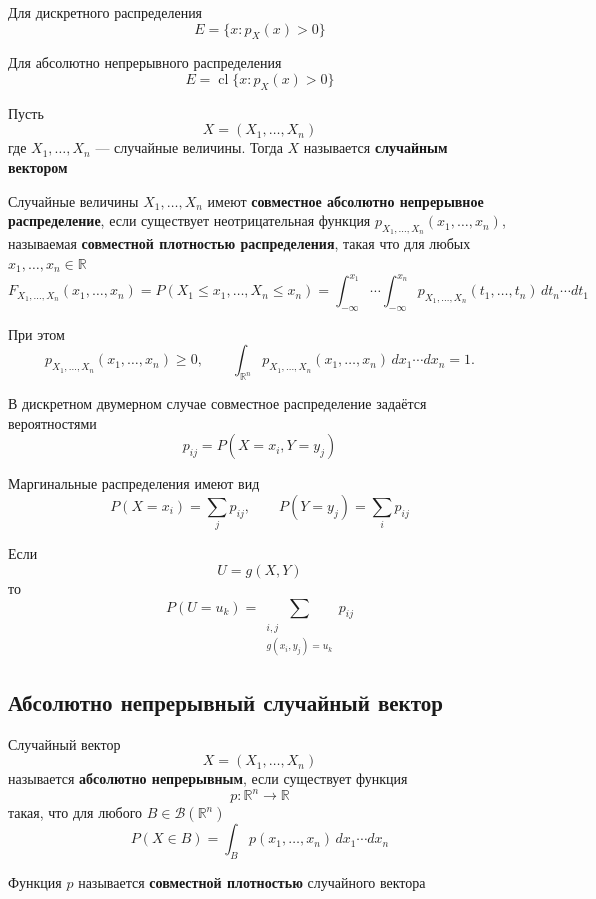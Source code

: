\documentclass[12pt,a4paper]{article}
\begin{document}
Для дискретного распределения
\[
E=\{x:p_X(x)>0\}
\]

Для абсолютно непрерывного распределения
\[
E=\operatorname{cl}\{x:p_X(x)>0\}
\]

\begin{definition}

Пусть
\[
X=(X_1,\ldots,X_n)
\]
где $X_1,\ldots,X_n$ --- случайные величины. Тогда $X$ называется \textbf{случайным вектором}

\end{definition}

\begin{definition}
    Случайные величины $X_1,\ldots,X_n$ имеют
    \textbf{совместное абсолютно непрерывное распределение},
    если существует неотрицательная функция
    $p_{X_1,\ldots,X_n}(x_1,\ldots,x_n)$,
    называемая \textbf{совместной плотностью распределения},
    такая что для любых $x_1,\ldots,x_n\in\mathbb{R}$
    \[
    F_{X_1,\ldots,X_n}(x_1,\ldots,x_n)
    =
    P(X_1\le x_1,\ldots,X_n\le x_n)
    =
    \int_{-\infty}^{x_1}\cdots
    \int_{-\infty}^{x_n}
    p_{X_1,\ldots,X_n}(t_1,\ldots,t_n)
    \,dt_n\cdots dt_1
    \]

    При этом
    \[
    p_{X_1,\ldots,X_n}(x_1,\ldots,x_n)\ge 0,
    \qquad
    \int_{\mathbb{R}^n}
    p_{X_1,\ldots,X_n}(x_1,\ldots,x_n)
    \,dx_1\cdots dx_n=1.
    \]
\end{definition}

В дискретном двумерном случае совместное распределение задаётся вероятностями
\[
p_{ij}=P(X=x_i,Y=y_j)
\]

Маргинальные распределения имеют вид
\[
P(X=x_i)=\sum_j p_{ij},
\qquad
P(Y=y_j)=\sum_i p_{ij}
\]

Если
\[
U=g(X,Y)
\]
то
\[
P(U=u_k)
=
\sum_{\substack{i,j\\g(x_i,y_j)=u_k}}p_{ij}
\]

\subsection{Абсолютно непрерывный случайный вектор}

\begin{definition}

Случайный вектор
\[
X=(X_1,\ldots,X_n)
\]
называется \textbf{абсолютно непрерывным}, если существует функция
\[
p:\mathbb{R}^n\to\mathbb{R}
\]
такая, что для любого $B\in\mathcal{B}(\mathbb{R}^n)$
\[
P(X\in B)
=
\int_B p(x_1,\ldots,x_n)\,dx_1\cdots dx_n
\]

Функция $p$ называется \textbf{совместной плотностью} случайного вектора

\end{definition}
\end{document}
